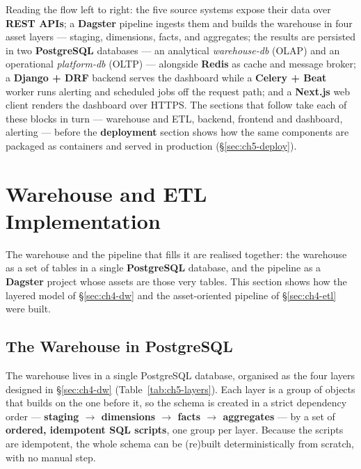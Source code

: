 Reading the flow left to right: the five source systems expose their data over \textbf{REST APIs}; a
\textbf{Dagster} pipeline ingests them and builds the warehouse in four asset layers --- staging,
dimensions, facts, and aggregates; the results are persisted in two \textbf{PostgreSQL} databases --- an
analytical \emph{warehouse-db} (OLAP) and an operational \emph{platform-db} (OLTP) --- alongside
\textbf{Redis} as cache and message broker; a \textbf{Django + DRF} backend serves the dashboard while a
\textbf{Celery + Beat} worker runs alerting and scheduled jobs off the request path; and a
\textbf{Next.js} web client renders the dashboard over HTTPS. The sections that follow take each of these
blocks in turn --- warehouse and ETL, backend, frontend and dashboard, alerting --- before the
\textbf{deployment} section shows how the same components are packaged as containers and served in
production (\S\ref{sec:ch5-deploy}).

\section{Warehouse and ETL Implementation}
\label{sec:ch5-data}

The warehouse and the pipeline that fills it are realised together: the warehouse as a set of tables in
a single \textbf{PostgreSQL} database, and the pipeline as a \textbf{Dagster} project whose assets are
those very tables. This section shows how the layered model of \S\ref{sec:ch4-dw} and the asset-oriented
pipeline of \S\ref{sec:ch4-etl} were built.

\subsection{The Warehouse in PostgreSQL}

The warehouse lives in a single PostgreSQL database, organised as the four layers designed in
\S\ref{sec:ch4-dw} (Table~\ref{tab:ch5-layers}). Each layer is a group of objects that builds on the one
before it, so the schema is created in a strict dependency order --- \textbf{staging $\rightarrow$
dimensions $\rightarrow$ facts $\rightarrow$ aggregates} --- by a set of \textbf{ordered, idempotent SQL
scripts}, one group per layer. Because the scripts are idempotent, the whole schema can be (re)built
deterministically from scratch, with no manual step.

